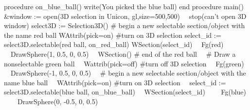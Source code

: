 \documentclass[letterpaper]{article}
\begin{document}
{{\sffamily
procedure on\_blue\_ball()\newline
 write({\textquotedbl}You picked the blue ball{\textquotedbl})\newline
end\newline
\newline
procedure main()\newline
 \&window := open({\textquotedbl}3D selection in Unicon{\textquotedbl},
{\textquotedbl}gl{\textquotedbl},{\textquotedbl}size=500,500{\textquotedbl}) {\textbar}\newline
\ \  stop({\textquotedbl}can't open 3D window{\textquotedbl}) \newline
 select3D := Selection3D()\newline
 \# begin a new selectable section/object with the name {\textquotedbl}red ball{\textquotedbl}\newline
 WAttrib({\textquotedbl}pick=on{\textquotedbl}) \#turn on 3D selection \newline
 select\_id := select3D.selectable({\textquotedbl}red ball{\textquotedbl}, on\_red\_ball) \newline
 WSection(select\_id)\newline
 \ \ Fg({\textquotedbl}red{\textquotedbl})\newline
 \ \ DrawSphere(1, 0.5, 0, 0.5)\newline
 \ \ WSection() \# end of the red ball \newline
\newline
 \ \ \# Draw a nonselectable green ball\newline
 \ \ Wattrib({\textquotedbl}pick=off{\textquotedbl}) \#turn off 3D selection\newline
 \ \ Fg({\textquotedbl}green{\textquotedbl})\newline
 \ \ DrawSphere(-1, 0.5, 0, 0.5) \newline
\newline
 \ \ \# begin a new selectable section/object with the name {\textquotedbl}blue ball{\textquotedbl} \newline
 \ \ WAttrib({\textquotedbl}pick=on{\textquotedbl}) \#turn on 3D selection\newline
 \ \ select\_id := select3D.selectable({\textquotedbl}blue ball{\textquotedbl}, on\_blue\_ball)\newline
 \ \ WSection(select\_id)\newline
 \ \ \ \ Fg({\textquotedbl}blue{\textquotedbl})\newline
 \ \ \ \ DrawSphere(0, -0.5, 0, 0.5)\newline
}}
\end{document}

